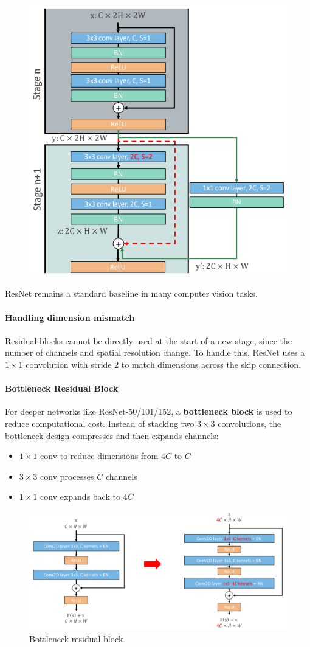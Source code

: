 \begin{figure}[htbp]
  \centering
  \includegraphics[width=0.4\linewidth]{./img/resnet_skip.png}
\end{figure}

ResNet remains a standard baseline in many computer vision tasks.

\paragraph{Handling dimension mismatch}
Residual blocks cannot be directly used at the start of a new stage, since the number of channels and spatial resolution change. To handle this, ResNet uses a $1 \times 1$ convolution with stride 2 to match dimensions across the skip connection.

\paragraph{Bottleneck Residual Block}
For deeper networks like ResNet-50/101/152, a \textbf{bottleneck block} is used to reduce computational cost. Instead of stacking two $3 \times 3$ convolutions, the bottleneck design compresses and then expands channels:
\begin{itemize}
  \item $1 \times 1$ conv to reduce dimensions from $4C$ to $C$
  \item $3 \times 3$ conv processes $C$ channels
  \item $1 \times 1$ conv expands back to $4C$
\end{itemize}

\begin{figure}[htbp]
  \centering
  \includegraphics[width=0.8\linewidth]{./img/resnet_bottleneck.png}
  \caption{Bottleneck residual block}
\end{figure}

